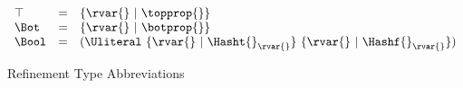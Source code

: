 \begin{figure*}
$$
\begin{array}{lclr}
  \top &=& {\refinenotype {\rvar{}} {\topprop{}}}\\
  \Bot &=& {\refinenotype {\rvar{}} {\botprop{}}}\\
  \Bool &=& \Unionsplice{\refinenotype{\rvar{}}{\isprop{\Hasht{}}{\rvar{}}}\ 
    \refinenotype{\rvar{}}{\isprop{\Hashf{}}{\rvar{}}}}\\
\end{array}
$$
\caption{Refinement Type Abbreviations}
\end{figure*}
